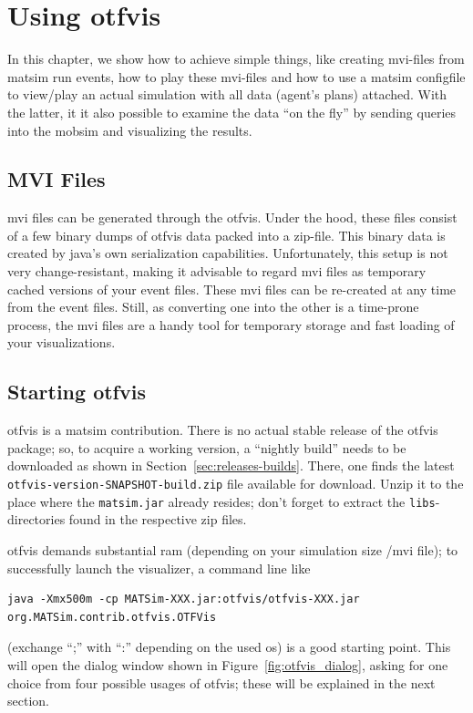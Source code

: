 \section{Using \gls{otfvis}} 
In this chapter, we show how to achieve simple things, like creating \gls{mvi}-files from \gls{matsim} run events, how to play these \gls{mvi}-files and how to use a \gls{matsim} \gls{configfile} to view/play an actual simulation with all data (\eg agent's plans) attached. With the latter, it it also possible to examine the data ``on the fly'' by sending queries into the \gls{mobsim} and visualizing the results.

\subsection{MVI Files}
\gls{mvi} files can be generated through the \gls{otfvis}. Under the hood, these files consist of a few binary dumps of \gls{otfvis} data packed into a zip-file. This binary data is created by \gls{java}'s own serialization capabilities. Unfortunately, this setup is not very change-resistant, making it advisable to regard \gls{mvi} files as temporary cached versions of your event files. These \gls{mvi} files can be re-created at any time from the event files. Still, as converting one into the other is a time-prone process, the \gls{mvi} files are a handy tool for temporary storage and fast loading of your visualizations.

\subsection{Starting \gls{otfvis}}
\gls{otfvis} is a \gls{matsim} \gls{contribution}. 
There is no actual stable release of the \gls{otfvis} package; 
so, to acquire a working version, a ``nightly build'' needs to be downloaded as shown in Section~\ref{sec:releases-builds}. 
There, one finds the latest \lstinline|otfvis-version-SNAPSHOT-build.zip| file available for download. 
Unzip it to the place where the \lstinline|matsim.jar| already resides; don't forget to extract the \lstinline|libs|-directories found in the respective zip files. 

\gls{otfvis} demands substantial \gls{ram} (depending on your simulation size /\gls{mvi} file); to successfully launch the visualizer, a command line like 
\begin{lstlisting}
java -Xmx500m -cp MATSim-XXX.jar:otfvis/otfvis-XXX.jar org.MATSim.contrib.otfvis.OTFVis
\end{lstlisting}
(exchange ``;'' with ``:'' depending on the used \gls{os})
is a good starting point. 
This will open the dialog window shown in Figure~\ref{fig:otfvis_dialog}, asking for one choice from four possible usages of \gls{otfvis}; 
these will be explained in the next section.

